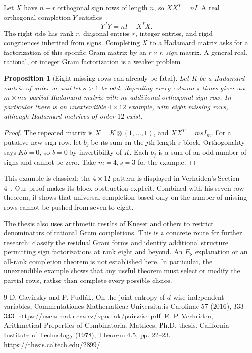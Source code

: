 \documentclass[11pt]{article}
\newtheorem{proposition}[theorem]{Proposition}
\begin{document}
Let $X$ have $n-r$ orthogonal sign rows of length $n$, so
$XX^T=nI$. A real orthogonal completion $Y$ satisfies
\[
 Y^TY=nI-X^TX.
\]
The right side has rank $r$, diagonal entries $r$, integer entries,
and rigid congruences inherited from signs. Completing $X$ to a
Hadamard matrix asks for a factorization of this specific Gram matrix
by an $r\times n$ \emph{sign} matrix. A general real, rational, or
integer Gram factorization is a weaker problem.

\begin{proposition}[Eight missing rows can already be fatal]
\label{prop:eight-defect}
Let $K$ be a Hadamard matrix of order $m$ and let $s>1$ be odd.
Repeating every column $s$ times gives an $m\times ms$ partial
Hadamard matrix with no additional orthogonal sign row.
In particular there is an unextendible $4\times12$ example, with
eight missing rows, although Hadamard matrices of order $12$ exist.
\end{proposition}
\begin{proof}
The repeated matrix is $X=K\otimes(1,\ldots,1)$, and
$XX^T=msI_m$. For a putative new sign row, let $b_j$ be its sum
on the $j$th length-$s$ block. Orthogonality says $Kb=0$, so $b=0$
by invertibility of $K$. Each $b_j$ is a sum of an odd number of
signs and cannot be zero. Take $m=4,s=3$ for the example.
\end{proof}
This example is classical: the $4\times12$ pattern is displayed
in Verheiden's Section 4~\cite{Verheiden}. Our proof makes its block
obstruction explicit. Combined with his seven-row theorem, it shows
that universal completion based only on the number of missing rows
cannot be pushed from seven to eight.

The thesis also uses arithmetic results of Kneser and others to
restrict denominators of rational Gram completions. This is a
concrete route for further research: classify the residual Gram
forms and identify additional structure permitting sign factorizations
at rank eight and beyond. An $E_8$ explanation or an all-rank
completion theorem is not established here. In particular, the
unextendible example shows that any useful theorem must select or
modify the partial rows, rather than complete every possible choice.

\begin{thebibliography}{9}
 D. Gavinsky and P. Pudl\'ak,
On the joint entropy of $d$-wise-independent variables,
Commentationes Mathematicae Universitatis Carolinae 57 (2016), 333--343.
\url{https://users.math.cas.cz/~pudlak/pairwise.pdf}.
 E. P. Verheiden,
Arithmetical Properties of Combinatorial Matrices, Ph.D. thesis,
California Institute of Technology (1978), Theorem 4.5, pp. 22--23.
\url{https://thesis.caltech.edu/2899/}.
\end{thebibliography}
\end{document}
